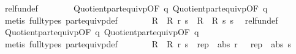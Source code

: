 \begin{isabellebody}
\ rel{\isacharunderscore}{\kern0pt}fun{\isacharunderscore}{\kern0pt}def\isanewline
\ \ \ \ \ \ \isamarkupfalse%
\ Quotient{}{\isacharunderscore}{\kern0pt}part{\isacharunderscore}{\kern0pt}equivp{\isacharbrackleft}{\kern0pt}OF\ q{}{\isacharbrackright}{\kern0pt}\ Quotient{}{\isacharunderscore}{\kern0pt}part{\isacharunderscore}{\kern0pt}equivp{\isacharbrackleft}{\kern0pt}OF\ q{}{\isacharbrackright}{\kern0pt}\isanewline
\ \ \ \ \ \ \isamarkupfalse%
\ {\isacharparenleft}{\kern0pt}metis\ {\isacharparenleft}{\kern0pt}full{\isacharunderscore}{\kern0pt}types{\isacharparenright}{\kern0pt}\ part{\isacharunderscore}{\kern0pt}equivp{\isacharunderscore}{\kern0pt}def{\isacharparenright}{\kern0pt}\isanewline
\ \ \ \ \isamarkupfalse%
\ \isamarkupfalse%
\ {\isachardoublequoteopen}{\isacharparenleft}{\kern0pt}R{}\ {\isacharequal}{\kern0pt}{\isacharequal}{\kern0pt}{\isacharequal}{\kern0pt}{\isachargreater}{\kern0pt}\ R{}{\isacharparenright}{\kern0pt}\ r\ s\ {\isasymLongrightarrow}\ {\isacharparenleft}{\kern0pt}R{}\ {\isacharequal}{\kern0pt}{\isacharequal}{\kern0pt}{\isacharequal}{\kern0pt}{\isachargreater}{\kern0pt}\ R{}{\isacharparenright}{\kern0pt}\ s\ s{\isachardoublequoteclose}\ \isamarkupfalse%
\ rel{\isacharunderscore}{\kern0pt}fun{\isacharunderscore}{\kern0pt}def\isanewline
\ \ \ \ \ \ \isamarkupfalse%
\ Quotient{}{\isacharunderscore}{\kern0pt}part{\isacharunderscore}{\kern0pt}equivp{\isacharbrackleft}{\kern0pt}OF\ q{}{\isacharbrackright}{\kern0pt}\ Quotient{}{\isacharunderscore}{\kern0pt}part{\isacharunderscore}{\kern0pt}equivp{\isacharbrackleft}{\kern0pt}OF\ q{}{\isacharbrackright}{\kern0pt}\isanewline
\ \ \ \ \ \ \isamarkupfalse%
\ {\isacharparenleft}{\kern0pt}metis\ {\isacharparenleft}{\kern0pt}full{\isacharunderscore}{\kern0pt}types{\isacharparenright}{\kern0pt}\ part{\isacharunderscore}{\kern0pt}equivp{\isacharunderscore}{\kern0pt}def{\isacharparenright}{\kern0pt}\isanewline
\ \ \ \ \isamarkupfalse%
\ \isamarkupfalse%
\ {\isachardoublequoteopen}{\isacharparenleft}{\kern0pt}R{}\ {\isacharequal}{\kern0pt}{\isacharequal}{\kern0pt}{\isacharequal}{\kern0pt}{\isachargreater}{\kern0pt}\ R{}{\isacharparenright}{\kern0pt}\ r\ s\ {\isasymLongrightarrow}\ {\isacharparenleft}{\kern0pt}rep{}\ {\isacharminus}{\kern0pt}{\isacharminus}{\kern0pt}{\isacharminus}{\kern0pt}{\isachargreater}{\kern0pt}\ abs{}{\isacharparenright}{\kern0pt}\ r\ \ {\isacharequal}{\kern0pt}\ {\isacharparenleft}{\kern0pt}rep{}\ {\isacharminus}{\kern0pt}{\isacharminus}{\kern0pt}{\isacharminus}{\kern0pt}{\isachargreater}{\kern0pt}\ abs{}{\isacharparenright}{\kern0pt}\ s{\isachardoublequoteclose}\isanewline

\end{isabellebody}
